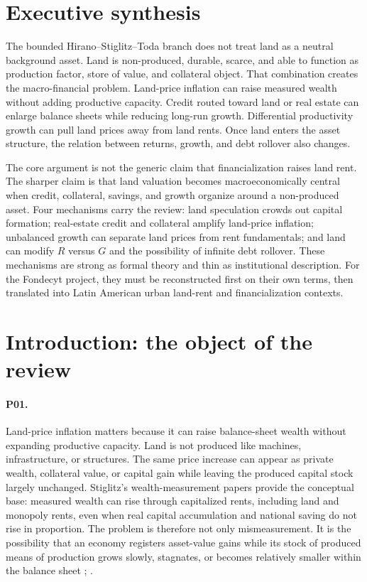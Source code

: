\documentclass[11pt]{article}
\newcommand{\SHT}{Hirano--Stiglitz--Toda}
\begin{document}
\section*{Executive synthesis}

The bounded \SHT{} branch does not treat land as a neutral background asset. Land is non-produced, durable, scarce, and able to function as production factor, store of value, and collateral object. That combination creates the macro-financial problem. Land-price inflation can raise measured wealth without adding productive capacity. Credit routed toward land or real estate can enlarge balance sheets while reducing long-run growth. Differential productivity growth can pull land prices away from land rents. Once land enters the asset structure, the relation between returns, growth, and debt rollover also changes.

The core argument is not the generic claim that financialization raises land rent. The sharper claim is that land valuation becomes macroeconomically central when credit, collateral, savings, and growth organize around a non-produced asset. Four mechanisms carry the review: land speculation crowds out capital formation; real-estate credit and collateral amplify land-price inflation; unbalanced growth can separate land prices from rent fundamentals; and land can modify \(R\) versus \(G\) and the possibility of infinite debt rollover. These mechanisms are strong as formal theory and thin as institutional description. For the Fondecyt project, they must be reconstructed first on their own terms, then translated into Latin American urban land-rent and financialization contexts.

\section{Introduction: the object of the review}

\paragraph{P01.} Land-price inflation matters because it can raise balance-sheet wealth without expanding productive capacity. Land is not produced like machines, infrastructure, or structures. The same price increase can appear as private wealth, collateral value, or capital gain while leaving the produced capital stock largely unchanged. Stiglitz's wealth-measurement papers provide the conceptual base: measured wealth can rise through capitalized rents, including land and monopoly rents, even when real capital accumulation and national saving do not rise in proportion. The problem is therefore not only mismeasurement. It is the possibility that an economy registers asset-value gains while its stock of produced means of production grows slowly, stagnates, or becomes relatively smaller within the balance sheet \citep[pp.~1--2, 4, 11]{stiglitz2015MeasurementWealth}; \citep[pp.~10--11, 28]{stiglitz2015WealthResidual}.
\end{document}
